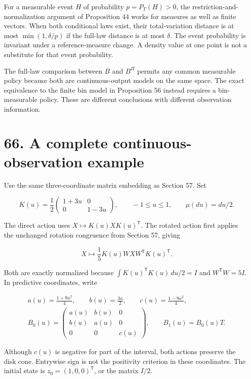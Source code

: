 \documentclass[11pt,letterpaper]{article}
\begin{document}
For a measurable event \(H\) of probability \(p=P_T(H)>0\), the
restriction-and-normalization argument of Proposition 44 works for
measures as well as finite vectors. When both conditional laws exist,
their total-variation distance is at most \(\min(1,\delta/p)\) if the
full-law distance is at most \(\delta\). The event probability is
invariant under a reference-measure change. A density value at one point
is not a substitute for that event probability.

The full-law comparison between \(B\) and \(B^\Pi\) permits any common
measurable policy because both are continuous-output models on the same
space. The exact equivalence to the finite bin model in Proposition 56
instead requires a bin-measurable policy. These are different
conclusions with different observation information.

\section{66. A complete continuous-observation
example}\label{a-complete-continuous-observation-example}

Use the same three-coordinate matrix embedding as Section 57. Set

\[
K(u)=\frac12\begin{pmatrix}1+3u&0\\0&1-3u\end{pmatrix},
\qquad -1\leq u\leq1,
\qquad \mu(du)=du/2.
\]

The direct action uses \(X\mapsto K(u)XK(u)^{\mathsf T}\). The rotated
action first applies the unchanged rotation congruence from Section 57,
giving

\[
X\longmapsto\frac15 K(u)WXW^{\mathsf T}K(u)^{\mathsf T}.
\]

Both are exactly normalized because
\(\int K(u)^{\mathsf T}K(u)\,du/2=I\) and \(W^{\mathsf T}W=5I\). In
predictive coordinates, write

\[
\begin{gathered}
a(u)=\frac{1+9u^2}{4},\qquad
b(u)=\frac{3u}{2},\qquad
c(u)=\frac{1-9u^2}{4},\\[3pt]
B_0(u)=\begin{pmatrix}a(u)&b(u)&0\\b(u)&a(u)&0\\0&0&c(u)\end{pmatrix},
\qquad B_1(u)=B_0(u)T.
\end{gathered}
\]

Although \(c(u)\) is negative for part of the interval, both actions
preserve the disk cone. Entrywise sign is not the positivity criterion
in these coordinates. The initial state is \(z_0=(1,0,0)^{\mathsf T}\),
or the matrix \(I/2\).
\end{document}

